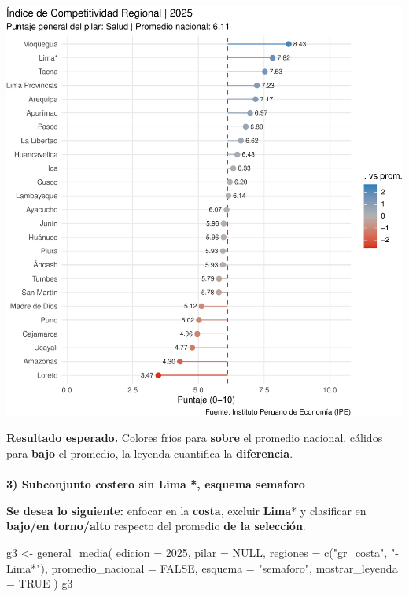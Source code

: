 \documentclass[
  11pt,
  letterpaper,
  DIV=11,
  numbers=noendperiod]{scrartcl}
\makeatletter
\let\oldparagraph\paragraph
\renewcommand{\paragraph}{
    \@ifstar
      \xxxParagraphStar
      \xxxParagraphNoStar
  }
\newcommand{\xxxParagraphStar}[1]{\oldparagraph*{#1}\mbox{}}
\newcommand{\xxxParagraphNoStar}[1]{\oldparagraph{#1}\mbox{}}
\newenvironment{Shaded}{\begin{snugshade}}{\end{snugshade}}
\newcommand{\AttributeTok}[1]{\textcolor[rgb]{0.40,0.45,0.13}{#1}}
\newcommand{\ConstantTok}[1]{\textcolor[rgb]{0.56,0.35,0.01}{#1}}
\newcommand{\DecValTok}[1]{\textcolor[rgb]{0.68,0.00,0.00}{#1}}
\newcommand{\FunctionTok}[1]{\textcolor[rgb]{0.28,0.35,0.67}{#1}}
\newcommand{\NormalTok}[1]{\textcolor[rgb]{0.00,0.23,0.31}{#1}}
\newcommand{\OtherTok}[1]{\textcolor[rgb]{0.00,0.23,0.31}{#1}}
\newcommand{\StringTok}[1]{\textcolor[rgb]{0.13,0.47,0.30}{#1}}
\makeatother
\begin{document}
\includegraphics{Manual_files/figure-pdf/unnamed-chunk-48-1.pdf}

\textbf{Resultado esperado.} Colores fríos para \textbf{sobre} el
promedio nacional, cálidos para \textbf{bajo} el promedio, la leyenda
cuantifica la \textbf{diferencia}.

\paragraph{\texorpdfstring{\textbf{3) Subconjunto costero sin Lima *,
esquema
semaforo}}{3) Subconjunto costero sin Lima *, esquema semaforo}}\label{subconjunto-costero-sin-lima-esquema-semaforo}

\textbf{Se desea lo siguiente:} enfocar en la \textbf{costa}, excluir
\textbf{Lima}* y clasificar en \textbf{bajo/en torno/alto} respecto del
promedio \textbf{de la selección}.

\begin{Shaded}
\begin{Highlighting}[]
\NormalTok{g3 }\OtherTok{\textless{}{-}} \FunctionTok{general\_media}\NormalTok{(}
  \AttributeTok{edicion =} \DecValTok{2025}\NormalTok{,}
  \AttributeTok{pilar   =} \ConstantTok{NULL}\NormalTok{,                         }
  \AttributeTok{regiones =} \FunctionTok{c}\NormalTok{(}\StringTok{"gr\_costa"}\NormalTok{, }\StringTok{"{-}Lima*"}\NormalTok{),}
  \AttributeTok{promedio\_nacional =} \ConstantTok{FALSE}\NormalTok{,                }
  \AttributeTok{esquema =} \StringTok{"semaforo"}\NormalTok{,}
  \AttributeTok{mostrar\_leyenda =} \ConstantTok{TRUE}
\NormalTok{)}
\NormalTok{g3}
\end{Highlighting}
\end{Shaded}
\end{document}

